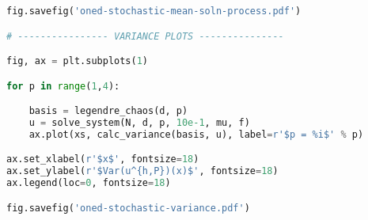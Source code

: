 \begin{lstlisting}[language=Python,
                   caption={Setup code used to obtain results for Chapter
                   \ref{chap:oned-stochastic}},
                   label={code:oned-stochastic-setup}]
fig.savefig('oned-stochastic-mean-soln-process.pdf')

# ---------------- VARIANCE PLOTS ---------------

fig, ax = plt.subplots(1)

for p in range(1,4):

    basis = legendre_chaos(d, p)
    u = solve_system(N, d, p, 10e-1, mu, f)
    ax.plot(xs, calc_variance(basis, u), label=r'$p = %i$' % p)

ax.set_xlabel(r'$x$', fontsize=18)
ax.set_ylabel(r'$Var(u^{h,P})(x)$', fontsize=18)
ax.legend(loc=0, fontsize=18)

fig.savefig('oned-stochastic-variance.pdf')

\end{lstlisting}


